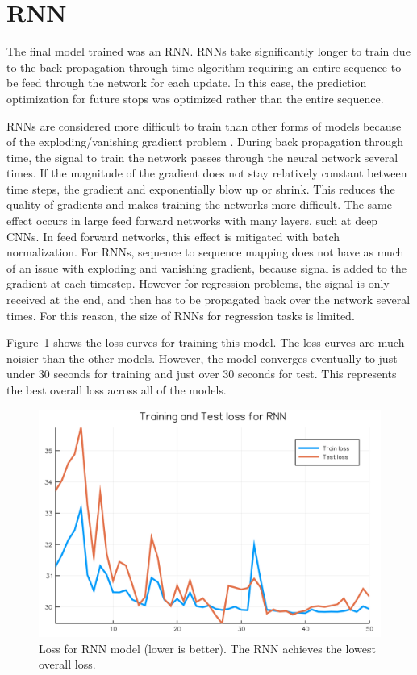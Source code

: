 \section{RNN}

The final model trained was an RNN.
RNNs take significantly longer to train due to the back propagation through time algorithm requiring an entire sequence to be feed through the network for each update.
In this case, the prediction optimization for future stops was optimized rather than the entire sequence.

RNNs are considered more difficult to train than other forms of models because of the exploding/vanishing gradient problem \cite{pascanu2013difficulty}.
During back propagation through time, the signal to train the network passes through the neural network several times.
If the magnitude of the gradient does not stay relatively constant between time steps, the gradient and exponentially blow up or shrink.
This reduces the quality of gradients and makes training the networks more difficult.
The same effect occurs in large feed forward networks with many layers, such at deep CNNs.
In feed forward networks, this effect is mitigated with batch normalization\cite{ioffe2015batch}.
For RNNs, sequence to sequence mapping does not have as much of an issue with exploding and vanishing gradient, because signal is added to the gradient at each timestep.
However for regression problems, the signal is only received at the end, and then has to be propagated back over the network several times.
For this reason, the size of RNNs for regression tasks is limited.

Figure~\ref{rnn_loss} shows the loss curves for training this model.
The loss curves are much noisier than the other models.
However, the model converges eventually to just under 30 seconds for training and just over 30 seconds for test.
This represents the best overall loss across all of the models.

\begin{figure}
\includegraphics[width=\linewidth]{images/rnn_loss.png}
\caption{Loss for RNN model (lower is better). The RNN achieves the lowest overall loss.}
\label{rnn_loss}
\end{figure}
\clearpage
\newpage


